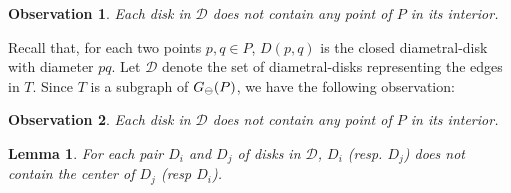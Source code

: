 \documentclass[11pt,a4paper]{article}
\newcommand{\G}[2]{G_{#1}({#2})}
\newcommand{\ddiscs}{\scriptsize \ominus}
\newtheorem{lemma}{Lemma}
\newtheorem{observation}{Observation}
\begin{document}
\begin{observation}
\label{no-point-in-circle-obs}
 Each disk in $\mathcal{D}$ does not contain any point of $P$ in its interior.
\end{observation}

Recall that, for each two points $p,q\in P$, $D(p,q)$ is the closed diametral-disk with diameter $pq$. Let $\mathcal{D}$ denote the set of diametral-disks representing the edges in $T$. Since $T$ is a subgraph of $\G{\ddiscs}{P}$, we have the following observation:

\begin{observation}
\label{no-point-in-circle-obs}
 Each disk in $\mathcal{D}$ does not contain any point of $P$ in its interior.
\end{observation}

\begin{lemma}
\label{center-in-lemma}
 For each pair $D_i$ and $D_j$ of disks in $\mathcal{D}$, $D_i$ (resp. $D_j$) does not contain the center of $D_j$ (resp $D_i$).
\end{lemma}
\end{document}
